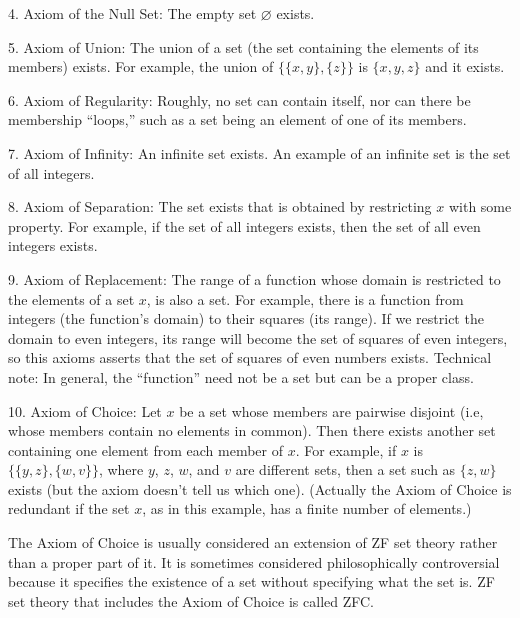 4. Axiom of the Null Set:  The empty set $\varnothing$ exists.

5. Axiom of Union:  The union of a set (the set containing the elements of
   its members) exists.  For example, the union of $\{\{x,y\},\{z\}\}$ is
 $\{x,y,z\}$ and
   it exists.

6. Axiom of Regularity:  Roughly, no set can contain itself, nor can there
   be membership ``loops,'' such as a set being an
   element of one of its members.

7. Axiom of Infinity:  An infinite set exists.  An example of an infinite
   set is the set of all
   integers.

8. Axiom of Separation:  The set exists that is obtained by restricting $x$
   with some property.  For example, if the set of all integers exists,
   then the set of all even integers exists.

9. Axiom of Replacement:  The range of a function whose domain is restricted
   to the elements of a set $x$, is also a set.  For example, there
   is a function
   from integers (the function's domain) to their squares (its
   range).  If we
   restrict the domain to even integers, its range will become the set of
   squares of even integers, so this axioms asserts that the set of
    squares of even numbers exists.  Technical note:  In general, the
   ``function'' need not be a set but can be a proper class.

10. Axiom of Choice:  Let $x$ be a set whose members are pairwise
  disjoint (i.e,
  whose members contain no elements in common).  Then there exists another
  set containing one element from each member of $x$.  For
  example, if $x$ is
  $\{\{y,z\},\{w,v\}\}$, where $y$, $z$, $w$, and $v$ are
  different sets, then a set such as $\{z,w\}$
  exists (but the axiom doesn't tell
  us which one).  (Actually the Axiom
  of Choice is redundant if the set $x$, as in this example, has a finite
  number of elements.)

The Axiom of Choice is usually considered an extension of ZF set theory rather
than a proper part of it.  It is sometimes considered philosophically
controversial because it specifies the existence of a set without specifying
what the set is.  ZF set theory that includes the Axiom of Choice is
called ZFC.

